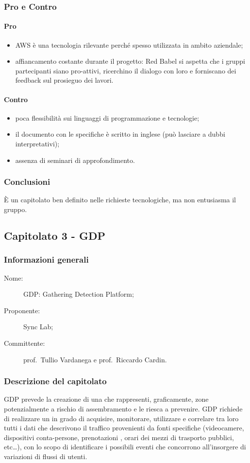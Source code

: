 \subsubsection{Pro e Contro}
\paragraph*{Pro}
\begin{itemize}
	\item AWS è una tecnologia rilevante perché spesso utilizzata in ambito aziendale;
	\item affiancamento costante durante il progetto: Red Babel si aspetta che i gruppi partecipanti siano pro-attivi, ricerchino il dialogo con loro e forniscano dei feedback sul prosieguo dei lavori.
\end{itemize}
\paragraph*{Contro}
\begin{itemize}
	\item poca flessibilità sui linguaggi di programmazione e tecnologie;
	\item il documento con le specifiche è scritto in inglese (può lasciare a dubbi interpretativi);
	\item assenza di seminari di approfondimento.
\end{itemize}
\subsubsection{Conclusioni}
È un capitolato ben definito nelle richieste tecnologiche, ma non entusiasma il gruppo.

\subsection{Capitolato 3 - GDP}
\subsubsection{Informazioni generali}
\begin{description}
	\item[Nome:] GDP: Gathering Detection Platform;
	\item[Proponente:] Sync Lab;
	\item[Committente:] prof.~Tullio Vardanega e prof.~Riccardo Cardin.
\end{description}
\subsubsection{Descrizione del capitolato}
GDP prevede la creazione di una  che rappresenti, graficamente, zone potenzialmente a rischio di assembramento e le riesca a prevenire. GDP richiede di realizzare un  in grado di acquisire, monitorare, utilizzare e correlare tra loro tutti i dati che descrivono il traffico provenienti da fonti specifiche (videocamere, dispositivi conta-persone, prenotazioni , orari dei mezzi di trasporto pubblici, etc\dots), con lo scopo di identificare i possibili eventi che concorrono all'insorgere di variazioni di flussi di utenti.

